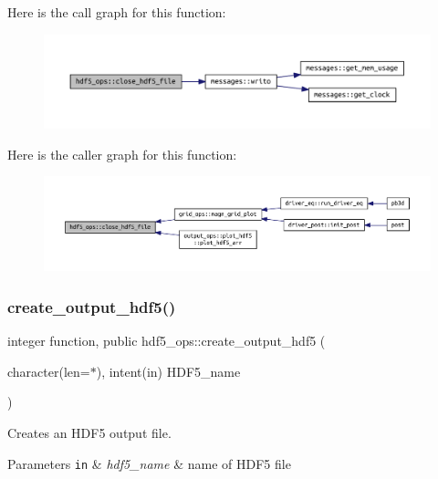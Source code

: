 Here is the call graph for this function\+:\nopagebreak
\begin{figure}[H]
\begin{center}
\leavevmode
\includegraphics[width=350pt]{namespacehdf5__ops_ad6c53fff55bd71f63470ca1e525ddb56_cgraph}
\end{center}
\end{figure}
Here is the caller graph for this function\+:\nopagebreak
\begin{figure}[H]
\begin{center}
\leavevmode
\includegraphics[width=350pt]{namespacehdf5__ops_ad6c53fff55bd71f63470ca1e525ddb56_icgraph}
\end{center}
\end{figure}
\mbox{\label{namespacehdf5__ops_a1263636fffc4f4aa86f72bd5fd3352a0}} 
\subsubsection{\texorpdfstring{create\+\_\+output\+\_\+hdf5()}{create\_output\_hdf5()}}
{\footnotesize\ttfamily integer function, public hdf5\+\_\+ops\+::create\+\_\+output\+\_\+hdf5 (\begin{DoxyParamCaption}\item[{character(len=$\ast$), intent(in)}]{H\+D\+F5\+\_\+name }\end{DoxyParamCaption})}



Creates an H\+D\+F5 output file. 


\begin{DoxyParams}[1]{Parameters}
\mbox{\tt in}  & {\em hdf5\+\_\+name} & name of H\+D\+F5 file \\
\hline
\end{DoxyParams}


